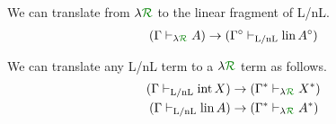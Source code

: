 \begin{theorem}
  We can translate from $\name$ to the linear fragment of L/nL.
  \begin{align}
    (\Gamma \vdash_{\name} A) \to (\Gamma^\circ \vdash_\lnl \lin A^\circ)
  \end{align}
\end{theorem}

\begin{theorem}
  We can translate any L/nL term to a $\name$ term as follows.
  \begin{align}
    (\Gamma \vdash_\lnl \intu X) &\to (\Gamma^* \vdash_{\name} X^*) \\
    (\Gamma \vdash_\lnl \lin A) &\to (\Gamma^* \vdash_{\name} A^*)
  \end{align}
\end{theorem}
